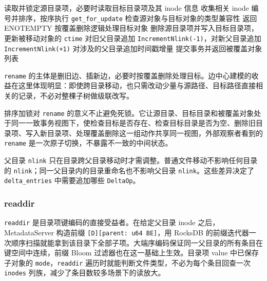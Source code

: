 \begin{algorithm}[H]
    \caption{\texttt{rename(old\_parent, old\_name, new\_parent, new\_name)} 的核心流程}
    \label{alg:rename}
    {\small
    \begin{algorithmic}[1]
        \State 读取并锁定源目录项，必要时读取目标目录项及其 inode 信息
        \State 收集相关 inode 编号并排序，按序执行 \texttt{get\_for\_update}
        \State 检查源对象与目标对象的类型兼容性
            \State 返回 \textsc{ENOTEMPTY}
        \EndIf
            \State 按覆盖删除逻辑处理目标对象
        \EndIf
        \State 删除源目录项并写入目标目录项，更新被移动对象的 \texttt{ctime}
            \State 对旧父目录追加 \texttt{IncrementNlink(-1)}，对新父目录追加 \texttt{IncrementNlink(+1)}
        \EndIf
        \State 对涉及的父目录追加时间戳增量
        \State 提交事务并返回被覆盖对象列表
    \end{algorithmic}}
\end{algorithm}

\texttt{rename} 的主体是删旧边、插新边，必要时按覆盖删除处理目标。边中心建模的收益在这里体现明显：即使跨目录移动，也只需改动少量与源路径、目标路径直接相关的记录，不必对整棵子树做级联改写。

排序加锁对 \texttt{rename} 的意义不止避免死锁。它让源目录、目标目录和被覆盖对象处于同一一致事务视图下，使检查目标是否存在、检查目标目录是否为空、删除旧目录项、写入新目录项、处理覆盖删除这一组动作共享同一视图，外部观察者看到的 \texttt{rename} 是一次原子切换，不暴露不一致的中间状态。

父目录 \texttt{nlink} 只在目录跨父目录移动时才需调整。普通文件移动不影响任何目录的 \texttt{nlink}；同一父目录内的目录重命名也不影响父目录 \texttt{nlink}。这些差异决定了 \texttt{delta\_entries} 中需要追加哪些 \texttt{DeltaOp}。

\subsubsection{readdir}

\texttt{readdir} 是目录项键编码的直接受益者。在给定父目录 inode 之后，MetadataServer 构造前缀 \texttt{[D][parent: u64 BE]}，用 RocksDB 的前缀迭代器一次顺序扫描就能拿到该目录下全部子项。大端序编码保证同一父目录的所有条目在键空间中连续，前缀 Bloom 过滤器也在这一基础上生效。目录项 value 中已保存子对象的 \texttt{mode}，\texttt{readdir} 遍历时就能判断文件类型，不必为每个条目回查一次 \texttt{inodes} 列族，减少了条目数较多场景下的读放大。


